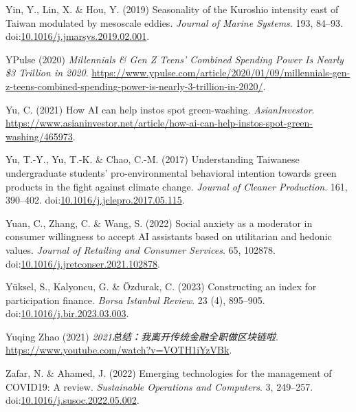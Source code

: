 \documentclass[
  letterpaper,
  DIV=11,
  numbers=noendperiod]{scrartcl}
\newlength{\cslhangindent}
\newenvironment{CSLReferences}[2] %
 {\begin{list}{}{%
  \setlength{\itemindent}{0pt}
  \setlength{\leftmargin}{0pt}
  \setlength{\parsep}{0pt}
  \ifodd #1
   \setlength{\leftmargin}{\cslhangindent}
   \setlength{\itemindent}{-1\cslhangindent}
  \fi
  \setlength{\itemsep}{#2\baselineskip}}}
 {\end{list}}
\begin{document}
\begin{CSLReferences}{0}{1}
Yin, Y., Lin, X. \& Hou, Y. (2019) Seasonality of the {Kuroshio}
intensity east of {Taiwan} modulated by mesoscale eddies. \emph{Journal
of Marine Systems}. 193, 84--93.
doi:\href{https://doi.org/10.1016/j.jmarsys.2019.02.001}{10.1016/j.jmarsys.2019.02.001}.

YPulse (2020) \emph{Millennials \& {Gen Z Teens}' {Combined Spending
Power Is Nearly} \$3 {Trillion} in 2020}.
\url{https://www.ypulse.com/article/2020/01/09/millennials-gen-z-teens-combined-spending-power-is-nearly-3-trillion-in-2020/}.

Yu, C. (2021) How {AI} can help instos spot green-washing.
\emph{AsianInvestor}.
\url{https://www.asianinvestor.net/article/how-ai-can-help-instos-spot-green-washing/465973}.

Yu, T.-Y., Yu, T.-K. \& Chao, C.-M. (2017) Understanding {Taiwanese}
undergraduate students' pro-environmental behavioral intention towards
green products in the fight against climate change. \emph{Journal of
Cleaner Production}. 161, 390--402.
doi:\href{https://doi.org/10.1016/j.jclepro.2017.05.115}{10.1016/j.jclepro.2017.05.115}.

Yuan, C., Zhang, C. \& Wang, S. (2022) Social anxiety as a moderator in
consumer willingness to accept {AI} assistants based on utilitarian and
hedonic values. \emph{Journal of Retailing and Consumer Services}. 65,
102878.
doi:\href{https://doi.org/10.1016/j.jretconser.2021.102878}{10.1016/j.jretconser.2021.102878}.

Yüksel, S., Kalyoncu, G. \& Özdurak, C. (2023) Constructing an index for
participation finance. \emph{Borsa Istanbul Review}. 23 (4), 895--905.
doi:\href{https://doi.org/10.1016/j.bir.2023.03.003}{10.1016/j.bir.2023.03.003}.

Yuqing Zhao (2021) \emph{2021总结：我离开传统金融全职做区块链啦}.
\url{https://www.youtube.com/watch?v=VOTH1iYzVBk}.

Zafar, N. \& Ahamed, J. (2022) Emerging technologies for the management
of {COVID19}: {A} review. \emph{Sustainable Operations and Computers}.
3, 249--257.
doi:\href{https://doi.org/10.1016/j.susoc.2022.05.002}{10.1016/j.susoc.2022.05.002}.


\end{CSLReferences}
\end{document}
